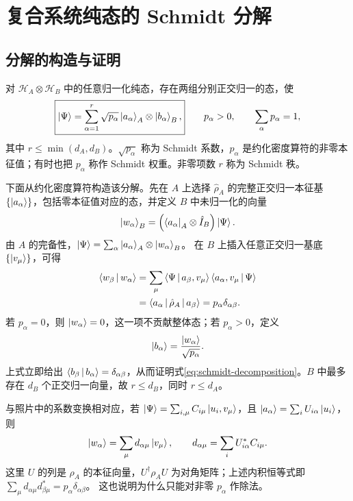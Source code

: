 \section{复合系统纯态的 Schmidt 分解}
\subsection{分解的构造与证明}
对 $\mathcal H_A\otimes\mathcal H_B$ 中的任意归一化纯态，存在两组分别正交归一的态，使
\begin{equation}
\boxed{\Ket{\Psi}=\sum_{\alpha=1}^{r}\sqrt{p_\alpha}
\Ket{a_\alpha}_A\otimes\Ket{b_\alpha}_B,}
\qquad p_\alpha>0,\qquad\sum_\alpha p_\alpha=1,
\label{eq:schmidt-decomposition}
\end{equation}
其中 $r\leq\min\left(d_A,d_B\right)$。$\sqrt{p_\alpha}$ 称为 Schmidt 系数，$p_\alpha$ 是约化密度算符的非零本征值；有时也把 $p_\alpha$ 称作 Schmidt 权重。非零项数 $r$ 称为 Schmidt 秩。

下面从约化密度算符构造该分解。先在 $A$ 上选择 $\hat\rho_A$ 的完整正交归一本征基 $\left\{\Ket{a_\alpha}\right\}$，包括零本征值对应的态，并定义 $B$ 中未归一化的向量
\begin{equation}
\Ket{w_\alpha}_B=\left(\Bra{a_\alpha}_A\otimes\hat I_B\right)\Ket{\Psi}.
\end{equation}
由 $A$ 的完备性，$\Ket{\Psi}=\sum_\alpha\Ket{a_\alpha}_A\otimes\Ket{w_\alpha}_B$。
在 $B$ 上插入任意正交归一基底 $\left\{\Ket{v_\mu}\right\}$，可得
\begin{align}
\Braket{w_\beta|w_\alpha}
&=\sum_\mu\Braket{\Psi|a_\beta,v_\mu}\Braket{a_\alpha,v_\mu|\Psi}\notag\\
&=\Braket{a_\alpha|\hat\rho_A|a_\beta}
=p_\alpha\delta_{\alpha\beta}.
\end{align}
若 $p_\alpha=0$，则 $\Ket{w_\alpha}=0$，这一项不贡献整体态；若 $p_\alpha>0$，定义
\begin{equation}
\Ket{b_\alpha}=\frac{\Ket{w_\alpha}}{\sqrt{p_\alpha}}.
\end{equation}
上式立即给出 $\Braket{b_\beta|b_\alpha}=\delta_{\alpha\beta}$，从而证明式\eqref{eq:schmidt-decomposition}。$B$ 中最多存在 $d_B$ 个正交归一向量，故 $r\leq d_B$，同时 $r\leq d_A$。

与照片中的系数变换相对应，若
$\Ket{\Psi}=\sum_{i,\mu}C_{i\mu}\Ket{u_i,v_\mu}$，且
$\Ket{a_\alpha}=\sum_iU_{i\alpha}\Ket{u_i}$，则
\begin{equation}
\Ket{w_\alpha}=\sum_\mu d_{\alpha\mu}\Ket{v_\mu},\qquad
d_{\alpha\mu}=\sum_iU_{i\alpha}^*C_{i\mu}.
\end{equation}
这里 $U$ 的列是 $\rho_A$ 的本征向量，$U^\dagger\rho_AU$ 为对角矩阵；上述内积恒等式即
$\sum_\mu d_{\alpha\mu}d_{\beta\mu}^*=p_\alpha\delta_{\alpha\beta}$。
这也说明为什么只能对非零 $p_\alpha$ 作除法。

